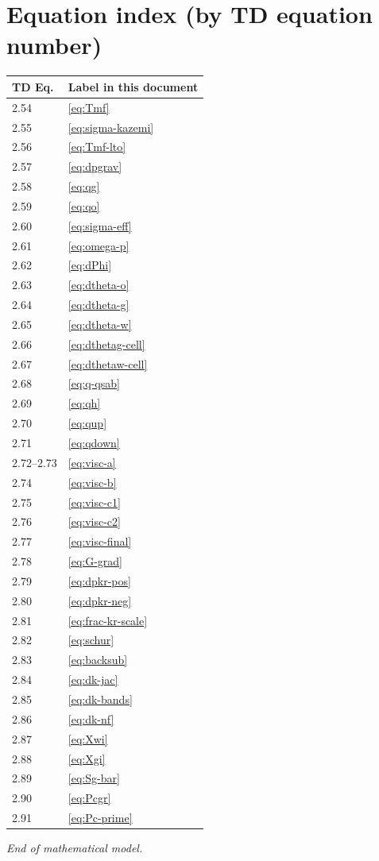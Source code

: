 \documentclass[11pt,a4paper]{article}
\begin{document}
\appendix
\section{Equation index (by TD equation number)}
\begin{center}\small
\begin{tabular}{ll}
\toprule
TD Eq. & Label in this document \\
\midrule
2.54 & \eqref{eq:Tmf} \\
2.55 & \eqref{eq:sigma-kazemi} \\
2.56 & \eqref{eq:Tmf-lto} \\
2.57 & \eqref{eq:dpgrav} \\
2.58 & \eqref{eq:qg} \\
2.59 & \eqref{eq:qo} \\
2.60 & \eqref{eq:sigma-eff} \\
2.61 & \eqref{eq:omega-p} \\
2.62 & \eqref{eq:dPhi} \\
2.63 & \eqref{eq:dtheta-o} \\
2.64 & \eqref{eq:dtheta-g} \\
2.65 & \eqref{eq:dtheta-w} \\
2.66 & \eqref{eq:dthetag-cell} \\
2.67 & \eqref{eq:dthetaw-cell} \\
2.68 & \eqref{eq:q-qsab} \\
2.69 & \eqref{eq:qh} \\
2.70 & \eqref{eq:qup} \\
2.71 & \eqref{eq:qdown} \\
2.72--2.73 & \eqref{eq:visc-a} \\
2.74 & \eqref{eq:visc-b} \\
2.75 & \eqref{eq:visc-c1} \\
2.76 & \eqref{eq:visc-c2} \\
2.77 & \eqref{eq:visc-final} \\
2.78 & \eqref{eq:G-grad} \\
2.79 & \eqref{eq:dpkr-pos} \\
2.80 & \eqref{eq:dpkr-neg} \\
2.81 & \eqref{eq:frac-kr-scale} \\
2.82 & \eqref{eq:schur} \\
2.83 & \eqref{eq:backsub} \\
2.84 & \eqref{eq:dk-jac} \\
2.85 & \eqref{eq:dk-bands} \\
2.86 & \eqref{eq:dk-nf} \\
2.87 & \eqref{eq:Xwi} \\
2.88 & \eqref{eq:Xgi} \\
2.89 & \eqref{eq:Sg-bar} \\
2.90 & \eqref{eq:Pcgr} \\
2.91 & \eqref{eq:Pc-prime} \\
\bottomrule
\end{tabular}
\end{center}

\bigskip\noindent
\emph{End of mathematical model.}
\end{document}
